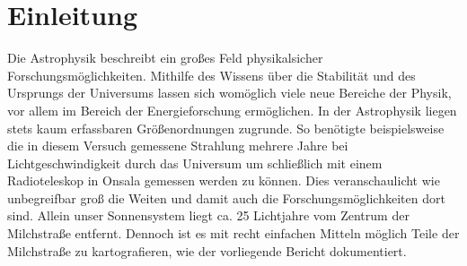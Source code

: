 \section{Einleitung}
Die Astrophysik beschreibt ein großes Feld physikalsicher Forschungsmöglichkeiten. Mithilfe des Wissens über die Stabilität und des Ursprungs der Universums lassen sich womöglich viele neue Bereiche der Physik, vor allem im Bereich der Energieforschung ermöglichen.
In der Astrophysik liegen stets kaum erfassbaren Größenordnungen zugrunde.
So benötigte beispielsweise die in diesem Versuch gemessene Strahlung mehrere Jahre bei Lichtgeschwindigkeit durch das Universum um schließlich mit einem Radioteleskop in Onsala gemessen werden zu können.
Dies veranschaulicht wie unbegreifbar groß die Weiten und damit auch die Forschungsmöglichkeiten dort sind.
Allein unser Sonnensystem liegt ca. 25 Lichtjahre vom Zentrum der Milchstraße entfernt.
Dennoch ist es mit recht einfachen Mitteln möglich Teile der Milchstraße zu kartografieren, wie der vorliegende Bericht dokumentiert.
\newline